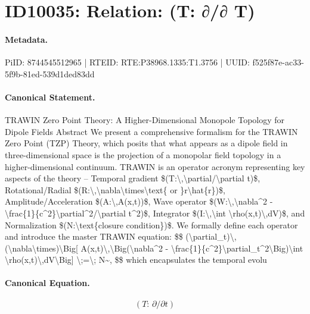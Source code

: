 \section*{ID10035: Relation: (T: ∂/∂ T)}
\paragraph{Metadata.}
PiID: 8744545512965 | RTEID: RTE:P38968.1335:T1.3756 | UUID: f525f87e-ac33-5f9b-81ed-539d1ded83dd

\paragraph{Canonical Statement.}
TRAWIN Zero Point Theory: A Higher-Dimensional Monopole Topology for Dipole Fields Abstract We present a comprehensive formalism for the TRAWIN Zero Point (TZP) Theory, which posits that what appears as a dipole field in three-dimensional space is the projection of a monopolar field topology in a higher-dimensional continuum. TRAWIN is an operator acronym representing key aspects of the theory – Temporal gradient \$(T:\textbackslash{},\textbackslash{}partial/\textbackslash{}partial t)\$, Rotational/Radial \$(R:\textbackslash{},\textbackslash{}nabla\textbackslash{}times\textbackslash{}text\{ or \}r\textbackslash{}hat\{r\})\$, Amplitude/Acceleration \$(A:\textbackslash{},A(x,t))\$, Wave operator \$(W:\textbackslash{},\textbackslash{}nabla\textasciicircum{}2 - \textbackslash{}frac\{1\}\{c\textasciicircum{}2\}\textbackslash{}partial\textasciicircum{}2/\textbackslash{}partial t\textasciicircum{}2)\$, Integrator \$(I:\textbackslash{},\textbackslash{}int \textbackslash{}rho(x,t)\textbackslash{},dV)\$, and Normalization \$(N:\textbackslash{}text\{closure condition\})\$. We formally define each operator and introduce the master TRAWIN equation: \$\$ (\textbackslash{}partial\_t)\textbackslash{},(\textbackslash{}nabla\textbackslash{}times)\textbackslash{}Big[ A(x,t)\textbackslash{},\textbackslash{}Big(\textbackslash{}nabla\textasciicircum{}2 - \textbackslash{}frac\{1\}\{c\textasciicircum{}2\}\textbackslash{}partial\_t\textasciicircum{}2\textbackslash{}Big)\textbackslash{}int \textbackslash{}rho(x,t)\textbackslash{},dV\textbackslash{}Big] \textbackslash{};=\textbackslash{}; N\textasciitilde{}, \$\$ which encapsulates the temporal evolu

\paragraph{Canonical Equation.}
\[
(T:\,\partial/\partial t)
\]

